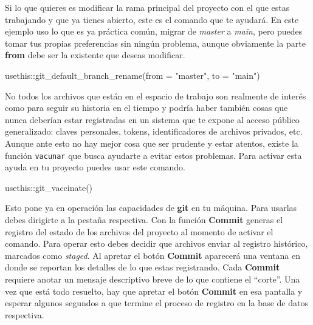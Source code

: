 \documentclass[
  letterpaper,
  DIV=11,
  numbers=noendperiod]{scrartcl}
\newenvironment{Shaded}{\begin{snugshade}}{\end{snugshade}}
\newcommand{\AttributeTok}[1]{\textcolor[rgb]{0.40,0.45,0.13}{#1}}
\newcommand{\FunctionTok}[1]{\textcolor[rgb]{0.28,0.35,0.67}{#1}}
\newcommand{\NormalTok}[1]{\textcolor[rgb]{0.00,0.23,0.31}{#1}}
\newcommand{\SpecialCharTok}[1]{\textcolor[rgb]{0.37,0.37,0.37}{#1}}
\newcommand{\StringTok}[1]{\textcolor[rgb]{0.13,0.47,0.30}{#1}}
\begin{document}
Si lo que quieres es modificar la rama principal del proyecto con el que
estas trabajando y que ya tienes abierto, este es el comando que te
ayudará. En este ejemplo uso lo que es ya práctica común, migrar de
\emph{master} a \emph{main}, pero puedes tomar tus propias preferencias
sin ningún problema, aunque obviamente la parte \textbf{from} debe ser
la existente que deseas modificar.

\begin{Shaded}
\begin{Highlighting}[]
\NormalTok{usethis}\SpecialCharTok{::}\FunctionTok{git\_default\_branch\_rename}\NormalTok{(}\AttributeTok{from =} \StringTok{"master"}\NormalTok{, }\AttributeTok{to =} \StringTok{"main"}\NormalTok{)}
\end{Highlighting}
\end{Shaded}

No todos los archivos que están en el espacio de trabajo son realmente
de interés como para seguir su historia en el tiempo y podría haber
también cosas que nunca deberían estar registradas en un sistema que te
expone al acceso público generalizado: claves personales, tokens,
identificadores de archivos privados, etc. Aunque ante esto no hay mejor
cosa que ser prudente y estar atentos, existe la función
\texttt{vacunar} que busca ayudarte a evitar estos problemas. Para
activar esta ayuda en tu proyecto puedes usar este comando.

\begin{Shaded}
\begin{Highlighting}[]
\NormalTok{usethis}\SpecialCharTok{::}\FunctionTok{git\_vaccinate}\NormalTok{()}
\end{Highlighting}
\end{Shaded}

Esto pone ya en operación las capacidades de \textbf{git} en tu máquina.
Para usarlas debes dirigirte a la pestaña respectiva. Con la función
\textbf{Commit} generas el registro del estado de los archivos del
proyecto al momento de activar el comando. Para operar esto debes
decidir que archivos enviar al registro histórico, marcados como
\emph{staged}. Al apretar el botón \textbf{Commit} aparecerá una ventana
en donde se reportan los detalles de lo que estas registrando. Cada
\textbf{Commit} requiere anotar un mensaje descriptivo breve de lo que
contiene el ``corte''. Una vez que está todo resuelto, hay que apretar
el botón \textbf{Commit} en esa pantalla y esperar algunos segundos a
que termine el proceso de registro en la base de datos respectiva.
\end{document}

